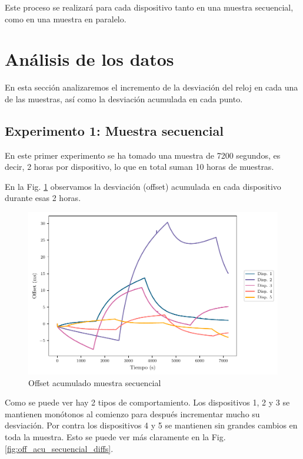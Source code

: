 Este proceso se realizará para cada dispositivo tanto en una muestra secuencial, como en una muestra en paralelo.


\section{Análisis de los datos}

En esta sección analizaremos el incremento de la desviación del reloj en cada una de las muestras, así como la desviación acumulada en cada punto.

\subsection{Experimento 1: Muestra secuencial}

En este primer experimento se ha tomado una muestra de \SI{7200}{} segundos, es decir, \SI{2}{} horas por dispositivo, lo que en total suman \SI{10}{} horas de muestras.

En la Fig. \ref{fig:off_acu_secuencial} observamos la desviación (offset) acumulada en cada dispositivo durante esas \SI{2}{} horas.

\begin{figure}
    \centering
    \includegraphics[scale=0.65]{../Python/plots/individual/offset_plot}
    \caption{Offset acumulado muestra secuencial}
    \label{fig:off_acu_secuencial}
\end{figure}

Como se puede ver hay 2 tipos de comportamiento. Los dispositivos 1, 2 y 3 se mantienen monótonos al comienzo para después incrementar mucho su desviación. Por contra los dispositivos 4 y 5 se mantienen sin grandes cambios en toda la muestra. Esto se puede ver más claramente en la Fig. \ref{fig:off_acu_secuencial_diffs}.

